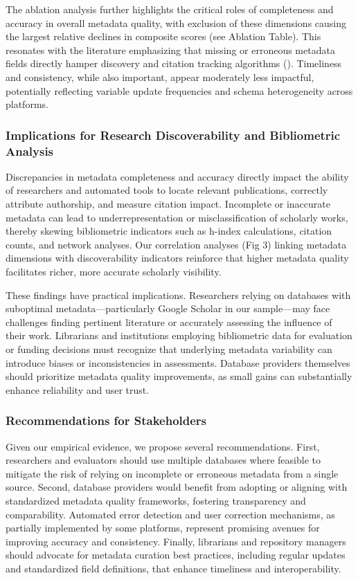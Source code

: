 \documentclass[
  12pt,
]{article}
\begin{document}
The ablation analysis further highlights the critical roles of
completeness and accuracy in overall metadata quality, with exclusion of
these dimensions causing the largest relative declines in composite
scores (see Ablation Table). This resonates with the literature
emphasizing that missing or erroneous metadata fields directly hamper
discovery and citation tracking algorithms (). Timeliness and consistency, while also important, appear
moderately less impactful, potentially reflecting variable update
frequencies and schema heterogeneity across platforms.

\subsubsection{Implications for Research Discoverability and
Bibliometric
Analysis}\label{implications-for-research-discoverability-and-bibliometric-analysis}

Discrepancies in metadata completeness and accuracy directly impact the
ability of researchers and automated tools to locate relevant
publications, correctly attribute authorship, and measure citation
impact. Incomplete or inaccurate metadata can lead to
underrepresentation or misclassification of scholarly works, thereby
skewing bibliometric indicators such as h-index calculations, citation
counts, and network analyses. Our correlation analyses (Fig 3) linking
metadata dimensions with discoverability indicators reinforce that
higher metadata quality facilitates richer, more accurate scholarly
visibility.

These findings have practical implications. Researchers relying on
databases with suboptimal metadata---particularly Google Scholar in our
sample---may face challenges finding pertinent literature or accurately
assessing the influence of their work. Librarians and institutions
employing bibliometric data for evaluation or funding decisions must
recognize that underlying metadata variability can introduce biases or
inconsistencies in assessments. Database providers themselves should
prioritize metadata quality improvements, as small gains can
substantially enhance reliability and user trust.

\subsubsection{Recommendations for
Stakeholders}\label{recommendations-for-stakeholders}

Given our empirical evidence, we propose several recommendations. First,
researchers and evaluators should use multiple databases where feasible
to mitigate the risk of relying on incomplete or erroneous metadata from
a single source. Second, database providers would benefit from adopting
or aligning with standardized metadata quality frameworks, fostering
transparency and comparability. Automated error detection and user
correction mechanisms, as partially implemented by some platforms,
represent promising avenues for improving accuracy and consistency.
Finally, librarians and repository managers should advocate for metadata
curation best practices, including regular updates and standardized
field definitions, that enhance timeliness and interoperability.
\end{document}
